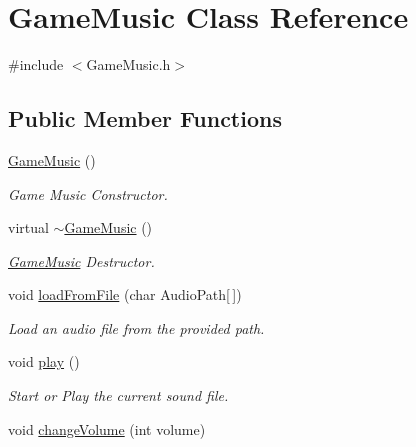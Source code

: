 \hypertarget{class_game_music}{}\section{Game\+Music Class Reference}
\label{class_game_music}


{\ttfamily \#include $<$Game\+Music.\+h$>$}

\subsection*{Public Member Functions}
\begin{DoxyCompactItemize}
\item 
\mbox{\label{class_game_music_a3636a483e9a9d86ff5700f4a13662dcb}} 
\hyperlink{class_game_music_a3636a483e9a9d86ff5700f4a13662dcb}{Game\+Music} ()
\begin{DoxyCompactList}\small\item\em Game Music Constructor. \end{DoxyCompactList}\item 
\mbox{\label{class_game_music_a3ab16e5c895c854c7c1642e5718508f2}} 
virtual \hyperlink{class_game_music_a3ab16e5c895c854c7c1642e5718508f2}{$\sim$\+Game\+Music} ()
\begin{DoxyCompactList}\small\item\em \hyperlink{class_game_music}{Game\+Music} Destructor. \end{DoxyCompactList}\item 
void \hyperlink{class_game_music_a47a770430dc1213a4b31ab0353549018}{load\+From\+File} (char Audio\+Path\mbox{[}$\,$\mbox{]})
\begin{DoxyCompactList}\small\item\em Load an audio file from the provided path. \end{DoxyCompactList}\item 
\mbox{\label{class_game_music_a88151bbcf754b0dc87e75cf5949b7602}} 
void \hyperlink{class_game_music_a88151bbcf754b0dc87e75cf5949b7602}{play} ()
\begin{DoxyCompactList}\small\item\em Start or Play the current sound file. \end{DoxyCompactList}\item 
void \hyperlink{class_game_music_adafedd8d8c1b98efbac108c8f8b826ac}{change\+Volume} (int volume)

\end{DoxyCompactItemize}
